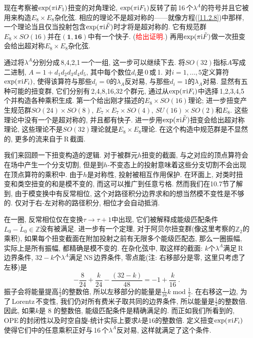 现在考察被$ \exp(\pi\mathrm{i} F_{1}) $扭变的对角理论, $\exp(\pi\mathrm{i} F_{1}) $反转了前\,16\,个$ \lambda^{A} $的符号并且它被用来构造$ E_{8}\times E_{8} $杂化弦. 相应的理论不是超对称的------就像方程(\ref{11.2.8})中那样, 一个理论当且仅当投射包含$ \exp(\pi\mathrm{i} \tilde{F}) $时才将是超对称的. 它有规范群$ E_{8}\times SO(16) $并在$ (\mathbf{1},\mathbf{16}) $中有一个快子. (\textcolor{red}{给出证明.}) 再用$ \exp(\pi\mathrm{i}\tilde{F}) $做一次扭变会给出超对称$ E_{8}\times E_{8} $杂化弦.

通过将$ \lambda^{A} $分别分成\,8,4,2,1\,一个一组, 这一步可以继续下去. 将$ SO(32) $指标$ A $写成二进制, $A=1+d_{1}d_{2}d_{3}d_{4}d_{5}$, 其中每个数位$ d_{i} $是\,0\,或\,1. 对$ i=1,\ldots,5 $定义算符$ \exp(\pi\mathrm{i} F_{i})$, 使得该算符与那些$ d_{i}=0 $的$ \lambda_{A} $反对易, 与那些$ d_{i}=1 $的$ \lambda_{A} $对易. 显然有五种可能的扭变群, 它们分别有\,2,4,8,16,32\,个群元, 通过从$ \exp(\pi\mathrm{i} F_{i}) $中选择\,1,2,3,4,5\,个并构造各种乘积生成. 第一个给出刚才描述的$ E_{8}\times SO(16) $理论; 进一步扭变产生规范群$ SO(24)\times SO(8)$, $E_{7}\times E_{7}\times SO(4)$, $SU(16)\times SO(2) $和$ E_{8}$. 这些理论中没有一个是超对称的, 并且都有快子. 进一步用$ \exp(\pi\mathrm{i}\tilde{F}) $扭变会给出超对称理论, 这些理论不是$ SO(32) $理论就是$ E_{8}\times E_{8} $理论. 在这个构造中规范群是不显然的, 更多的流来自于\,R\,截面.

我们来回顾一下扭变构造的逻辑. 对于被群元$ h $扭变的截面, 与之对应的顶点算符会在场中产生一个分支切割, 但是到$ h $-不变态上的投射意味着这些分支切割不会出现在顶点算符的乘积中. 由于$ h $是对称性, 投射被相互作用保护. 在环面上, 对类时扭变和类空扭变的和是模不变的, 而这可以推广到任意亏格. 然而我们在10.7节了解到, 由于模变换中有反常相位,  这个对路径积分边界求和的想当然模不变性是不够的. 仅对于右-左对称的路径积分, 相位才会自动抵消.

在一圈, 反常相位仅在变换$ \tau\to\tau+1 $中出现, 它们被解释成能级匹配条件$ L_{0}-\tilde{L}_{0}\in\mathds{Z} $没有被满足. 进一步有一个定理, 对于阿贝尔扭变群(像这里考察的$ \mathds{Z}_{2} $的乘积), 如果每个扭变截面在附加投射之前有无限多个能级匹配态, 那么一圈振幅, 实际上是所有振幅, 都精确是模不变的. 在杂化弦中, 取这样的截面: $k $个$ \lambda^{A} $满足\,R\,边界条件, $32-k $个$ \lambda^{A} $满足\,NS\,边界条件, 零点能(注: 右移部分是零, 这里只考虑了左移)是
\begin{equation}
    {-}\frac{8}{24}+\frac{k}{24}-\frac{(32-k)}{48}=-1+\frac{k}{16} \:. \label{11.3.6}
\end{equation}
振子会将能量提高$ \frac{1}{2} $的整数倍, 所以左移部分的能量是$ \frac{1}{16}k\operatorname{mod}\frac{1}{2}$. 在右移这一边, 为了\,Lorentz\,不变性, 我们仍对所有费米子取共同的边界条件, 所以能量是$ \frac{1}{2} $的整数倍. 因此, 如果$ k $是 $8$ 的整数倍, 能级匹配条件是精确满足的. 而正如我们所看到的, OPE\,的封闭性以及时空自旋-统计实际上要求$ k $是$ 16 $的整数倍. 定义扭变$ \exp(\pi\mathrm{i} F_{i}) $使得它们中的任意乘积正好与\,16\,个$ \lambda^{A} $反对易, 这样就满足了这个条件.



